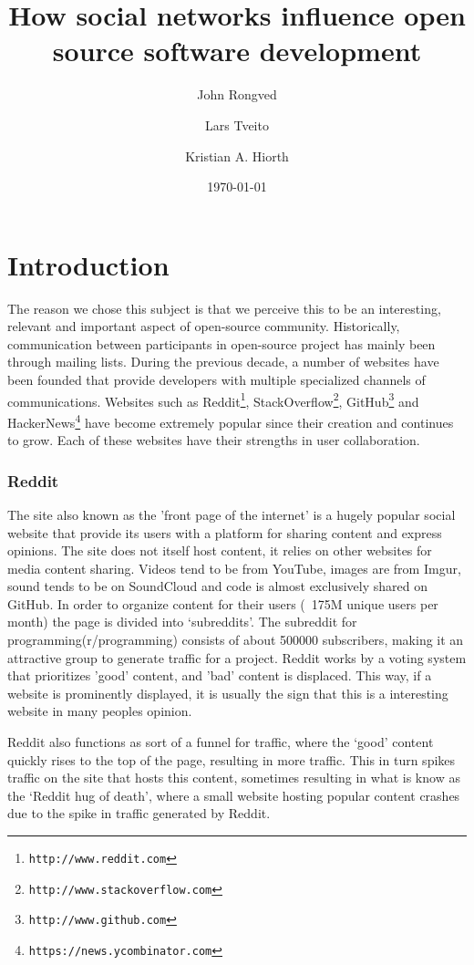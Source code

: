 \documentclass[a4paper,11pt]{article} %
\title{How social networks influence open source software development}
\date{\today}
\author{John Rongved \and Lars Tveito \and Kristian A. Hiorth}
\begin{document}
\ififorside{}

\tableofcontents{}

\section{Introduction}

The reason we chose this subject is that we perceive this to be an
interesting, relevant and important aspect of open-source
community. Historically, communication between participants in open-source
project has mainly been through mailing lists. During the previous decade, a
number of websites have been founded that provide developers with multiple
specialized channels of communications. Websites such as
Reddit\footnote{\texttt{http://www.reddit.com}},
StackOverflow\footnote{\texttt{http://www.stackoverflow.com}},
GitHub\footnote{\texttt{http://www.github.com}} and
HackerNews\footnote{\texttt{https://news.ycombinator.com}} have become
extremely popular since their creation and continues to grow. Each of these
websites have their strengths in user collaboration.


\subsubsection*{Reddit}
The site also known as the 'front page of the internet’ is a hugely popular
social website that provide its users with a platform for sharing content
and express opinions. The site does not itself host content, it relies on
other websites for media content sharing. Videos tend to be from YouTube,
images are from Imgur, sound tends to be on SoundCloud and code is almost
exclusively shared on GitHub. In order to organize content for their users
(~175M unique users per month) the page is divided into ‘subreddits’. The
subreddit for programming(r/programming) consists of about \num{500000}
subscribers, making it an attractive group to generate traffic for a
project. %
Reddit works by a voting system that prioritizes 'good' content, and 'bad'
content is displaced. This way, if a website is prominently displayed, it is
usually the sign that this is a interesting website in many peoples opinion.


Reddit also functions as sort of a funnel for traffic, where the ‘good’
content quickly rises to the top of the page, resulting in more
traffic. This in turn spikes traffic on the site that hosts this content,
sometimes resulting in what is know as the ‘Reddit hug of death’, where a
small website hosting popular content crashes due to the spike in traffic
generated by Reddit. %
\end{document}
